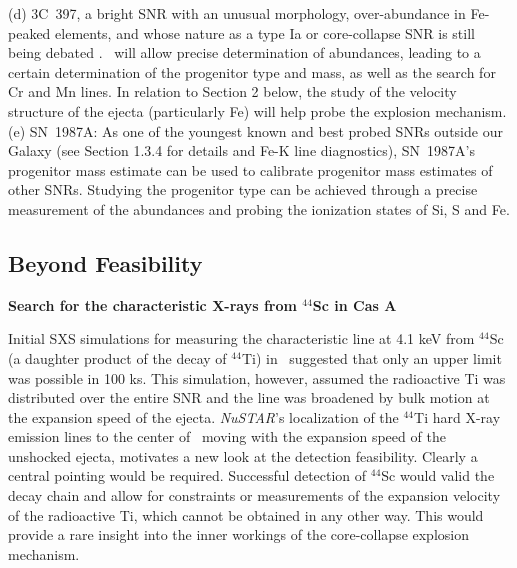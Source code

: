 \documentclass[11pt,a4paper]{article}
\begin{document}
{ (d) 3C~397, a bright SNR with an unusual morphology, over-abundance in Fe-peaked elements, 
 and whose nature as a type Ia or core-collapse SNR is still being debated \citep{chen99, ssh00, ssh05, yamaguchi14}.
 \ah\ will allow precise determination of abundances, leading to a certain determination of the
progenitor type and mass, as well as the search for Cr and Mn lines.
In relation to Section 2 below, the study of the velocity
 structure of the ejecta (particularly Fe) will help probe the explosion mechanism.\\
(e) SN~1987A: As one of the youngest known and best probed SNRs outside our Galaxy (see Section 1.3.4 for details and Fe-K line diagnostics),
SN~1987A's progenitor mass estimate can be used to calibrate progenitor mass estimates of other SNRs.
Studying the progenitor type can be achieved through a precise measurement of the abundances and probing the ionization states of Si, S and Fe.


\subsection{Beyond Feasibility}


{\bf Search for the characteristic X-rays from $^{44}$Sc in Cas A}

Initial SXS simulations for measuring the characteristic line at 4.1
keV from $^{44}$Sc (a daughter product of the decay of $^{44}$Ti) in
  \casa\ suggested that only an upper limit was possible in 100 ks.
  This simulation, however, assumed the radioactive Ti was distributed
  over the entire SNR and the line was broadened by bulk motion at the
  expansion speed of the ejecta.  {\it NuSTAR}'s localization of the
  $^{44}$Ti hard X-ray emission lines to the center of \casa\ moving
  with the expansion speed of the unshocked ejecta, motivates a new
  look at the detection feasibility.  Clearly a central pointing would
  be required.  Successful detection of $^{44}$Sc would valid the decay
    chain and allow for constraints or measurements of the expansion
    velocity of the radioactive Ti, which cannot be obtained in any
    other way.  This would provide a rare insight into the inner
    workings of the core-collapse explosion mechanism.

\vspace{0.25cm}


}
\end{document}
